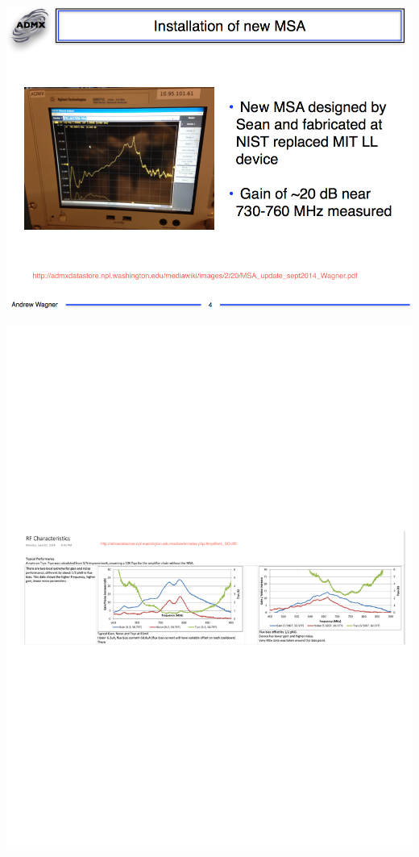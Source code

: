 \documentclass{beamer}
\begin{document}
\begin{frame}\includegraphics[width=\textwidth]{wagner_frequency}
\end{frame}

\begin{frame}\includegraphics[width=\textwidth]{sean_frequency}
\end{frame}
\end{document}
